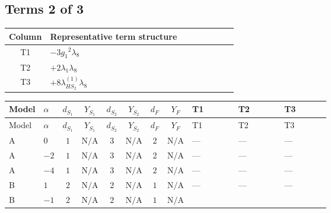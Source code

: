 \documentclass[8pt]{article}
\begin{document}
\begin{landscape}
\subsection*{Terms 2 of 3}
\begin{center}
\begin{tabular}{@{}c >{\raggedright\arraybackslash}p{0.82\linewidth}@{}}
\toprule
Column & Representative term structure \\
\midrule
T1 & \(\displaystyle -3 {g_1}^2 {\lambda_{8}}\) \\
\midrule
T2 & \(\displaystyle +2 {\lambda_1} {\lambda_{8}}\) \\
\midrule
T3 & \(\displaystyle +8 {\lambda_{HS_2}^{(1)}} {\lambda_{8}}\) \\
\midrule
\bottomrule
\end{tabular}
\end{center}
\smallskip
\tiny
\begin{longtable}{@{}llcccccc >{\raggedright\arraybackslash}p{0.21\linewidth} >{\raggedright\arraybackslash}p{0.21\linewidth} >{\raggedright\arraybackslash}p{0.21\linewidth}@{}}
\toprule
Model & $\alpha$ & $d_{S_1}$ & $Y_{S_1}$ & $d_{S_2}$ & $Y_{S_2}$ & $d_F$ & $Y_F$ & T1 & T2 & T3 \\
\midrule
\endfirsthead
\toprule
Model & $\alpha$ & $d_{S_1}$ & $Y_{S_1}$ & $d_{S_2}$ & $Y_{S_2}$ & $d_F$ & $Y_F$ & T1 & T2 & T3 \\
\midrule
\endhead
A & $0$ & $1$ & $\text{N/A}$ & $3$ & $\text{N/A}$ & $2$ & $\text{N/A}$ & --- & --- & --- \\
\midrule
A & $-2$ & $1$ & $\text{N/A}$ & $3$ & $\text{N/A}$ & $2$ & $\text{N/A}$ & --- & --- & --- \\
\midrule
A & $-4$ & $1$ & $\text{N/A}$ & $3$ & $\text{N/A}$ & $2$ & $\text{N/A}$ & --- & --- & --- \\
\midrule
B & $1$ & $2$ & $\text{N/A}$ & $2$ & $\text{N/A}$ & $1$ & $\text{N/A}$ & --- & --- & --- \\
\midrule
B & $-1$ & $2$ & $\text{N/A}$ & $2$ & $\text{N/A}$ & $1$ & $\text{N/A}$ & \scriptsize\adjustbox{max width=\linewidth}{$\begin{gathered} -3 {g_1}^2 {\lambda_{8}}\end{gathered}$} & \scriptsize\adjustbox{max width=\linewidth}{$\begin{gathered} +2 {\lambda_1} {\lambda_{8}}\end{gathered}$} & \scriptsize\adjustbox{max width=\linewidth}{$\begin{gathered} +8 {\lambda_{HS_2}^{(1)}} {\lambda_{8}}\end{gathered}$} \\

\end{longtable}
\end{landscape}
\end{document}
